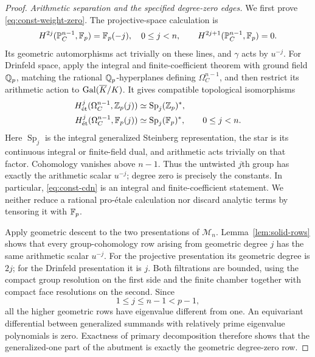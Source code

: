 \begin{proof}
\emph{Arithmetic separation and the specified degree-zero edges.}
We first prove \eqref{eq:const-weight-zero}.  The projective-space
calculation is
\[
 H^{2j}(\mathbb P^{n-1}_C,\mathbb F_p)=\mathbb F_p(-j),\quad 0\leq j<n,
 \qquad H^{2j+1}(\mathbb P^{n-1}_C,\mathbb F_p)=0.
\]
Its geometric automorphisms act trivially on these lines, and $\gamma$
acts by $u^{-j}$.  For Drinfeld space, apply the integral and
finite-coefficient theorem \cite[Theorems~1.1 and~5.1]{CDN} with ground
field $\mathbb Q_p$, matching the rational $\mathbb Q_p$-hyperplanes defining
$\Omega_C^{n-1}$, and then restrict its arithmetic action to
$\operatorname{Gal}(\overline K/K)$.  It gives compatible topological isomorphisms
\begin{equation}
 \begin{split}
 H^j_{\mathrm{\acute et}}(\Omega^{n-1}_C,\mathbb Z_p(j))
       &\simeq\operatorname{Sp}_j(\mathbb Z_p)^*,\\
 H^j_{\mathrm{\acute et}}(\Omega^{n-1}_C,\mathbb F_p(j))
       &\simeq\operatorname{Sp}_j(\mathbb F_p)^*,
                  \qquad 0\leq j<n.
 \end{split}
 \label{eq:const-cdn}
\end{equation}
Here $\operatorname{Sp}_j$ is the integral generalized Steinberg
representation, the star is its continuous integral or finite-field
dual, and arithmetic acts trivially on that factor.  Cohomology vanishes
above $n-1$.  Thus the untwisted $j$th group has exactly the arithmetic
scalar $u^{-j}$; degree zero is precisely the constants.  In particular,
\eqref{eq:const-cdn} is an integral and finite-coefficient statement.
We neither reduce a rational pro-\'{e}tale calculation nor discard
analytic terms by tensoring it with $\mathbb F_p$.

Apply geometric descent to the two presentations of $\mathcal M_n$.
Lemma~\ref{lem:solid-rows} shows that every group-cohomology row arising
from geometric degree $j$ has the same arithmetic scalar $u^{-j}$.
For the projective presentation its geometric degree is $2j$; for
the Drinfeld presentation it is $j$.  Both filtrations are bounded,
using the compact group resolution on the first side and the finite
chamber together with compact face resolutions on the second.  Since
\[
  1\leq j\leq n-1<p-1,
\]
all the higher geometric rows have eigenvalue different from one.
An equivariant differential between generalized summands with relatively
prime eigenvalue polynomials is zero.  Exactness of primary decomposition
therefore shows that the generalized-one part of the abutment is exactly
the geometric degree-zero row.


\end{proof}
